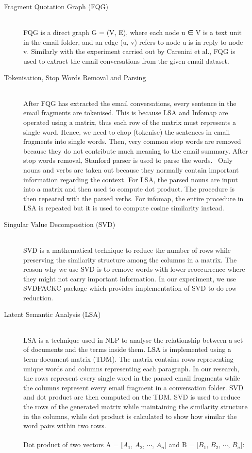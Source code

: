 \documentclass[a4paper, 12pt]{article}
\begin{document}
\begin{description}
	\item[Fragment Quotation Graph (FQG)] \hfill \\
		FQG is a direct graph G = (V, E), where each node u ∈ V is a text unit in the email folder, and an edge (u, v) refers 		to node u is in reply to node v. Similarly with the experiment carried out by Carenini et al., FQG is used to 			extract the email conversations from the given email dataset.

	\item[Tokenisation, Stop Words Removal and Parsing ] \hfill \\
		After FQG has extracted the email conversations, every sentence in the email fragments are tokenised. This is because LSA and Infomap are operated using a matrix, thus each row of the matrix must represents a single word. Hence, we need to chop (tokenise) the sentences in email fragments into single words.  Then, very common stop words are removed because they do not contribute much meaning to the email summary. After stop words removal, Stanford parser is used to parse the words.~\cite{Stanford2014} Only nouns and verbs are taken out because they normally contain important information regarding the context. For LSA, the parsed nouns are input into a matrix and then used to compute dot product. The procedure is then repeated with the parsed verbs. For infomap, the entire procedure in LSA is repeated but it is used to compute cosine similarity instead.

	\item[Singular Value Decomposition (SVD)]\hfill \\
		SVD is a mathematical technique to reduce the number of rows while preserving the similarity structure among the columns in a matrix. The reason why we use SVD is to remove words with lower reoccurrence where they might not carry important information. In our experiment, we use SVDPACKC package which provides implementation of SVD to do row reduction.~\cite{Berry1993}

	\item[Latent Semantic Analysis (LSA)]\hfill \\
		LSA is a technique used in NLP to analyse the relationship between a set of documents and the terms inside them. LSA is implemented using a term-document matrix (TDM). The matrix contains rows representing unique words and columns representing each paragraph. In our research, the rows represent every single word in the parsed email fragments while the columns represent every email fragment in a conversation folder. SVD and dot product are then computed on the TDM. SVD is used to reduce the rows of the generated matrix while maintaining the similarity structure in the columns, while dot product is calculated to show how similar the word pairs within two rows. \\ \\
		Dot product of two vectors A = [{$A_1$, $A_2$, $\cdots$, $A_n$}] and B = [{$B_1$, $B_2$, $\cdots$, $B_n$}]:
			 

\end{description}
\end{document}

